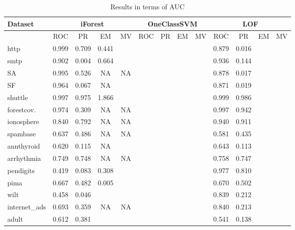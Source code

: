 \begin{table}[!ht]
\centering
\begin{tabular}{|l|cccc|cccc|cccc|}
  \hline
Dataset      & \multicolumn{4}{c|}{iForest}& \multicolumn{4}{c|}{OneClassSVM}  & \multicolumn{4}{c|}{LOF} \\ %
  \hline
~            & ROC  & PR   & EM   &  MV    & ROC  & PR   & EM   & MV           & ROC  & PR   & EM   & MV  \\
http         &0.999 &0.709 &0.441 &        &      &      &      &              &0.879 &0.016 &      &     \\
smtp         &0.902 &0.004 &0.664 &        &      &      &      &              &0.936 &0.144 &      &     \\
SA           &0.995 &0.526 &  NA  &  NA    &      &      &      &              &0.878 &0.017 &      &     \\
SF           &0.964 &0.067 &  NA  &        &      &      &      &              &0.871 &0.019 &      &     \\
shuttle      &0.997 &0.975 &1.866 &        &      &      &      &              &0.999 &0.986 &      &     \\
forestcov.   &0.974 &0.309 &  NA  &  NA    &      &      &      &              &0.997 &0.942 &      &     \\
ionosphere   &0.840 &0.792 &  NA  &  NA    &      &      &      &              &0.940 &0.911 &      &     \\
spambase     &0.637 &0.486 &  NA  &  NA    &      &      &      &              &0.581 &0.435 &      &     \\
annthyroid   &0.620 &0.115 &  NA  &        &      &      &      &              &0.643 &0.113 &      &     \\
arrhythmia   &0.749 &0.748 &  NA  &  NA    &      &      &      &              &0.758 &0.747 &      &     \\
pendigits    &0.419 &0.083 &0.308 &        &      &      &      &              &0.977 &0.810 &      &     \\
pima         &0.667 &0.482 &0.005 &        &      &      &      &              &0.670 &0.502 &      &     \\
wilt         &0.458 &0.046 &      &        &      &      &      &              &0.839 &0.212 &      &     \\
internet\_ads&0.693 &0.359 &  NA  &  NA    &      &      &      &              &0.840 &0.213 &      &     \\
adult        &0.612 &0.381 &      &        &      &      &      &              &0.541 &0.138 &      &     \\
  \hline
\end{tabular}
\caption{Results in terms of AUC}
\label{back:table:results-unsupervised}
\end{table}

